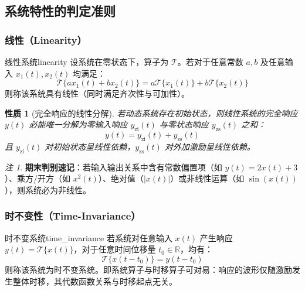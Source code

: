 \documentclass[11pt,a4paper,fontset=fandol]{ctexart}
\newtheorem{property}[theorem]{性质}
\theoremstyle{remark}
\newtheorem{remark}{注}[section]
\begin{document}
\subsection{系统特性的判定准则}

\subsubsection{线性（Linearity）}
\begin{definition}{线性系统}{linearity}
设系统在零状态下，算子为 $\mathcal{T}$。若对于任意常数 $a, b$ 及任意输入 $x_1(t), x_2(t)$ 均满足：
\begin{equation}
    \mathcal{T}\{a x_1(t) + b x_2(t)\} = a \mathcal{T}\{x_1(t)\} + b \mathcal{T}\{x_2(t)\}
\end{equation}
则称该系统具有线性（同时满足齐次性与可加性）。
\end{definition}

\begin{property}[完全响应的线性分解]
若动态系统存在初始状态，则线性系统的完全响应 $y(t)$ 必能唯一分解为零输入响应 $y_{\mathrm{zi}}(t)$ 与零状态响应 $y_{\mathrm{zs}}(t)$ 之和：
\begin{equation}
    y(t) = y_{\mathrm{zi}}(t) + y_{\mathrm{zs}}(t)
\end{equation}
且 $y_{\mathrm{zi}}(t)$ 对初始状态呈线性依赖，$y_{\mathrm{zs}}(t)$ 对外加激励呈线性依赖。
\end{property}

\begin{remark}
\textbf{期末判别速记}：若输入输出关系中含有常数偏置项（如 $y(t) = 2x(t) + 3$）、乘方/开方（如 $x^2(t)$）、绝对值（$|x(t)|$）或非线性运算（如 $\sin(x(t))$），则系统必为非线性。
\end{remark}

\subsubsection{时不变性（Time-Invariance）}
\begin{definition}{时不变系统}{time_invariance}
若系统对任意输入 $x(t)$ 产生响应 $y(t) = \mathcal{T}\{x(t)\}$，对于任意时间位移量 $t_0 \in \mathbb{R}$，均有：
\begin{equation}
    \mathcal{T}\{x(t - t_0)\} = y(t - t_0)
\end{equation}
则称该系统为时不变系统。即系统算子与时移算子可对易：响应的波形仅随激励发生整体时移，其代数函数关系与时移起点无关。
\end{definition}
\end{document}
